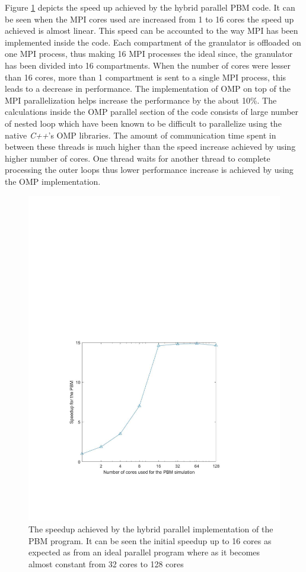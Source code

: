 \documentclass[preprint,11pt,authoryear]{elsarticle}
\begin{document}
Figure \ref{fig:rslts_PBM_speed_up} depicts the speed up achieved by the hybrid parallel PBM code. It 
can be seen when the MPI cores used are increased from 1 to 16 cores the speed up achieved is 
almost linear. This speed can be accounted to the way MPI has been implemented inside the code. 
Each compartment of the granulator is  offloaded on one MPI process, thus making 16 MPI processes 
the ideal since, the granulator has been divided into 16 compartments. When the number of cores 
were lesser than 16 cores, more than 1 compartment is sent to a single MPI process, this leads to a 
decrease in performance. The implementation of OMP on top of the MPI parallelization helps increase 
the performance by the about 10\%. The calculations inside the OMP parallel section of the code 
consists of large number of nested loop which have been known to be difficult to parallelize 
\citep{He2016} using the native \textit{C++}'s OMP libraries. The amount of communication time spent in 
between these threads is much higher than the speed increase achieved by using higher number of 
cores. One thread waits for another thread to complete processing the outer loops thus lower 
performance increase is achieved by using the OMP implementation. \\

\begin{figure}
\centering
\includegraphics[scale=0.75]{rslsts_PBM_speedup_logx.pdf}
\caption{The speedup achieved by the hybrid parallel implementation of the PBM program. It can be 
seen the initial speedup up to 16 cores as expected as from an ideal parallel 
program where as it 
becomes almost constant from 32 cores to 128 cores}
\label{fig:rslts_PBM_speed_up}
\end{figure}
\end{document}
